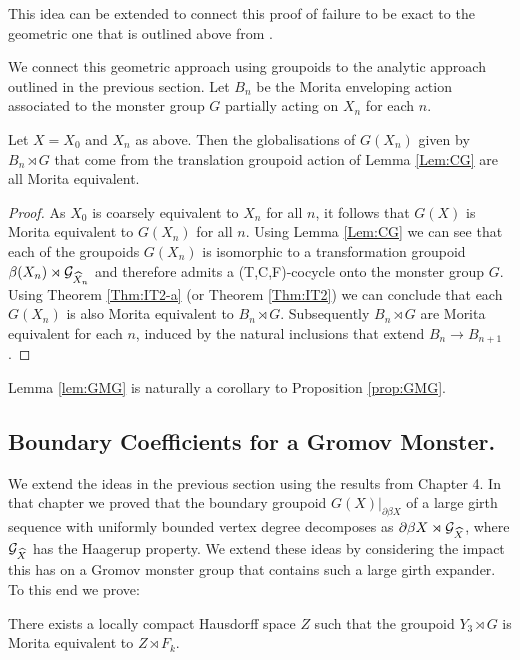 \begin{example}
This idea can be extended to connect this proof of failure to be exact to the geometric one that is outlined above from \cite{higsonpreprint,explg1}. 

We connect this geometric approach using groupoids to the analytic approach outlined in the previous section. Let $B_{n}$ be the Morita enveloping action associated to the monster group $G$ partially acting on $X_{n}$ for each $n$.

\begin{proposition}\label{prop:GMG}
Let $X=X_{0}$ and $X_{n}$ as above. Then the globalisations of $G(X_{n})$ given by $B_{n}\rtimes G$ that come from the translation groupoid action of Lemma \ref{Lem:CG} are all Morita equivalent.
\end{proposition}
\begin{proof}
As $X_{0}$ is coarsely equivalent to $X_{n}$ for all $n$, it follows that $G(X)$ is Morita equivalent to $G(X_{n})$ for all $n$. Using Lemma \ref{Lem:CG} we can see that each of the groupoids $G(X_{n})$ is isomorphic to a transformation groupoid $\beta(X_{n}) \rtimes \mathcal{G}_{\widehat{X}_{n}}$ and therefore admits a (T,C,F)-cocycle onto the monster group $G$. Using Theorem \ref{Thm:IT2-a} (or Theorem \ref{Thm:IT2}) we can conclude that each $G(X_{n})$ is also Morita equivalent to $B_{n}\rtimes G$. Subsequently $B_{n}\rtimes G$ are Morita equivalent for each $n$, induced by the natural inclusions that extend $B_{n} \rightarrow B_{n+1}$.  
\end{proof}

Lemma \ref{lem:GMG} is naturally a corollary to Proposition \ref{prop:GMG}.

\subsection{Boundary Coefficients for a Gromov Monster.}

We extend the ideas in the previous section using the results from Chapter 4. In that chapter we proved that the boundary groupoid $G(X)|_{\partial\beta X}$ of a large girth sequence with uniformly bounded vertex degree decomposes as $\partial\beta X \rtimes \mathcal{G}_{\widehat{X}}$, where $\mathcal{G}_{\widehat{X}}$ has the Haagerup property. We extend these ideas by considering the impact this has on a Gromov monster group that contains such a large girth expander. To this end we prove:

\begin{theorem}\label{Thm:GM2}
There exists a locally compact Hausdorff space $Z$ such that the groupoid $Y_{3}\rtimes G$ is Morita equivalent to $Z \rtimes F_{k}$.
\end{theorem}


\end{example}
